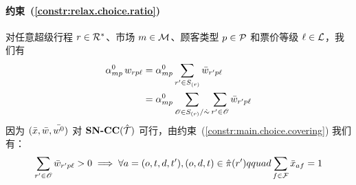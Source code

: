\paragraph*{约束~(\ref{constr:relax.choice.ratio})} 对任意超级行程 $r \in \mathcal{R}^{*}$、市场 $m \in \mathcal{M}$、顾客类型 $p \in \mathcal{P}$ 和票价等级 $\ell \in \mathcal{L}$，我们有
\begin{equation*}
\begin{aligned}
    \alpha^0_{mp}\, w_{rp\ell}
    & = \alpha^0_{mp} \sum_{r' \in S_{(r)}} \bar{w}_{r'p\ell}
    \\ & = \alpha^0_{mp} \sum_{\mathscr{O} \in S_{(r)}/\hat{\sim}} \sum_{r' \in \mathscr{O}} \bar{w}_{r'p\ell}
\end{aligned}
\end{equation*}
因为 $(\bar{x}, \bar{w}, \bar{{w^0}})$ 对 $\textbf{SN-CC}({\hat{\mathcal{T}}})$ 可行，由约束~(\ref{constr:main.choice.covering}) 我们有：
\[
    \sum_{r' \in \mathscr{O}} \bar{w}_{r'p\ell} > 0 \implies \forall a=(o,t,d,t'), (o,d,t)\in\hat{\pi}({r'}) \\qquad \sum_{f\in\mathcal{F}}\bar{x}_{af} = 1
\]


